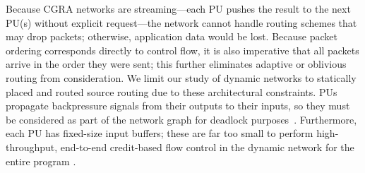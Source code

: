 Because CGRA networks are streaming---each PU pushes the result to the next PU(s) without explicit request---the network cannot handle routing schemes that may drop packets; otherwise, application data would be lost.
Because packet ordering corresponds directly to control flow, it is also imperative that all packets arrive in the order they were sent; this further eliminates adaptive or oblivious routing from consideration.
We limit our study of dynamic networks to statically placed and routed source routing due to these architectural constraints.
PUs propagate backpressure signals from their outputs to their inputs, so they must be considered as part of the network graph for deadlock purposes~\cite{hansson2007avoiding}.
Furthermore, each PU has fixed-size input buffers; these are far too small to perform high-throughput, end-to-end credit-based flow control in the dynamic network for the entire program \cite{wang2013avoiding}.
